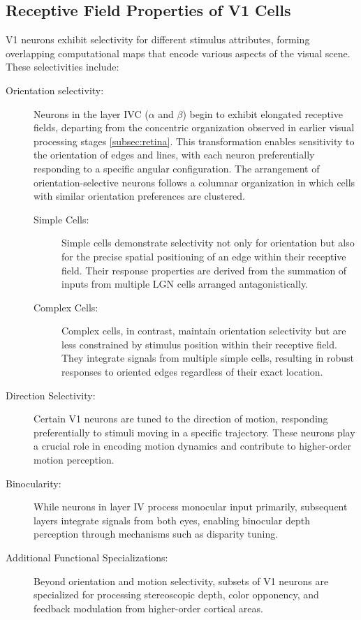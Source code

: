 \subsection{Receptive Field Properties of V1 Cells}
\label{subsec:receptive_field}
V1 neurons exhibit selectivity for different stimulus attributes, forming overlapping computational maps that encode various aspects of the visual scene. These selectivities include:

\begin{description}
    \item[Orientation selectivity:] Neurons in the layer IVC ($\alpha$ and $\beta$) begin to exhibit elongated receptive fields, departing from the concentric organization observed in earlier visual processing stages \ref{subsec:retina}. This transformation enables sensitivity to the orientation of edges and lines, with each neuron preferentially responding to a specific angular configuration. The arrangement of orientation-selective neurons follows a columnar organization in which cells with similar orientation preferences are clustered.
    \begin{description}
        \item[Simple Cells:] Simple cells demonstrate selectivity not only for orientation but also for the precise spatial positioning of an edge within their receptive field. Their response properties are derived from the summation of inputs from multiple LGN cells arranged antagonistically.
        \item[Complex Cells:] Complex cells, in contrast, maintain orientation selectivity but are less constrained by stimulus position within their receptive field. They integrate signals from multiple simple cells, resulting in robust responses to oriented edges regardless of their exact location.
    \end{description}
    \item[Direction Selectivity:] Certain V1 neurons are tuned to the direction of motion, responding preferentially to stimuli moving in a specific trajectory. These neurons play a crucial role in encoding motion dynamics and contribute to higher-order motion perception.
    \item[Binocularity:] While neurons in layer IV process monocular input primarily, subsequent layers integrate signals from both eyes, enabling binocular depth perception through mechanisms such as disparity tuning.
    \item[Additional Functional Specializations:] Beyond orientation and motion selectivity, subsets of V1 neurons are specialized for processing stereoscopic depth, color opponency, and feedback modulation from higher-order cortical areas.
\end{description}

